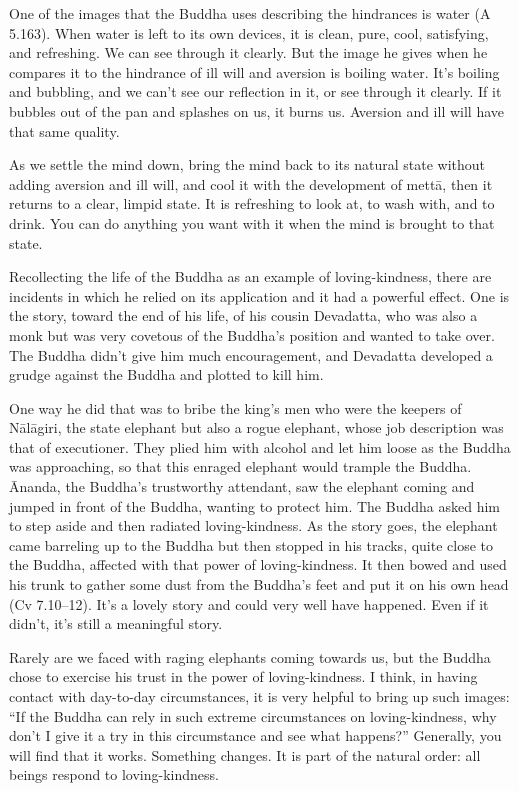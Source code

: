 One of the images that the Buddha uses describing the hindrances is
water (A 5.163). When water is left to its own devices, it is clean,
pure, cool, satisfying, and refreshing. We can see through it clearly.
But the image he gives when he compares it to the hindrance of ill will
and aversion is boiling water. It’s boiling and bubbling, and we can’t
see our reflection in it, or see through it clearly. If it bubbles out
of the pan and splashes on us, it burns us. Aversion and ill will have
that same quality.

As we settle the mind down, bring the mind back to its natural state
without adding aversion and ill will, and cool it with the development
of mettā, then it returns to a clear, limpid state. It is refreshing to
look at, to wash with, and to drink. You can do anything you want with
it when the mind is brought to that state.

Recollecting the life of the Buddha as an example of loving-kindness,
there are incidents in which he relied on its application and it had a
powerful effect. One is the story, toward the end of his life, of his
cousin Devadatta, who was also a monk but was very covetous of the
Buddha’s position and wanted to take over. The Buddha didn’t give him
much encouragement, and Devadatta developed a grudge against the Buddha
and plotted to kill him.

One way he did that was to bribe the king’s men who were the keepers of
Nālāgiri, the state elephant but also a rogue elephant, whose job
description was that of executioner. They plied him with alcohol and let
him loose as the Buddha was approaching, so that this enraged elephant
would trample the Buddha. Ānanda, the Buddha’s trustworthy attendant,
saw the elephant coming and jumped in front of the Buddha, wanting to
protect him. The Buddha asked him to step aside and then radiated
loving-kindness. As the story goes, the elephant came barreling up to
the Buddha but then stopped in his tracks, quite close to the Buddha,
affected with that power of loving-kindness. It then bowed and used his
trunk to gather some dust from the Buddha’s feet and put it on his own
head (Cv 7.10–12). It’s a lovely story and could very well have
happened. Even if it didn’t, it’s still a meaningful story.

Rarely are we faced with raging elephants coming towards us, but the
Buddha chose to exercise his trust in the power of loving-kindness. I
think, in having contact with day-to-day circumstances, it is very
helpful to bring up such images: “If the Buddha can rely in such extreme
circumstances on loving-kindness, why don’t I give it a try in this
circumstance and see what happens?” Generally, you will find that it
works. Something changes. It is part of the natural order: all beings
respond to loving-kindness.

